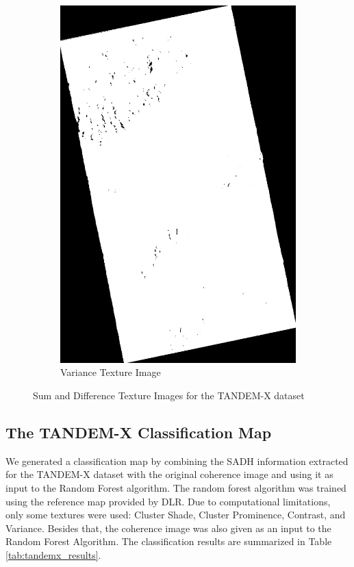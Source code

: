   \begin{figure}[H]\ContinuedFloat
    \centering
    \begin{subfigure}[b]{0.4\linewidth}
      \includegraphics[width=\linewidth]{Cap3-Results/sum_and_diff_textures/varianceimage.png}
       \caption{Variance Texture Image}
    \end{subfigure}
    \caption{Sum and Difference Texture Images for the TANDEM-X dataset}
    \label{fig:tandemx_textures}
  \end{figure}

\subsection{The TANDEM-X Classification Map}
We generated a classification map by combining the SADH information extracted for the TANDEM-X dataset with the original coherence image and using it as input to the Random Forest algorithm. The random forest algorithm was trained using the reference map provided by DLR. Due to computational limitations, only some textures were used: Cluster Shade, Cluster Prominence, Contrast, and Variance. Besides that, the coherence image was also given as an input to the Random Forest Algorithm. The classification results are summarized in Table \ref{tab:tandemx_results}.

